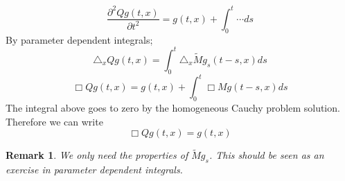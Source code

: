 \documentclass[12pt, oneside, a4paper]{article}
\theoremstyle{dfn}
\newtheorem{rem}[thm]{Remark}
\begin{document}
\begin{equation*}
 \frac{\partial^2 Qg(t,x)}{\partial t^2} = g(t,x) + \int^t_0 \cdots ds
\end{equation*}
By parameter dependent integrals;
\begin{equation*}
 \triangle_x Qg(t,x) =\int^t_0 \triangle_x \tilde{M}g_s(t-s,x) ds
\end{equation*}
\begin{equation*}
 \Box Qg(t,x) = g(t,x) + \int^t_0 \Box Mg(t-s,x)ds
\end{equation*}
The integral above goes to zero by the homogeneous Cauchy problem solution. 
Therefore we can write 
\begin{equation}
 \Box Qg(t,x) = g(t,x)
\end{equation}
\begin{rem}
 We only need the properties of $\tilde{M}g_s$. This should be seen as an exercise in parameter dependent integrals. 
\end{rem}
\end{document}
